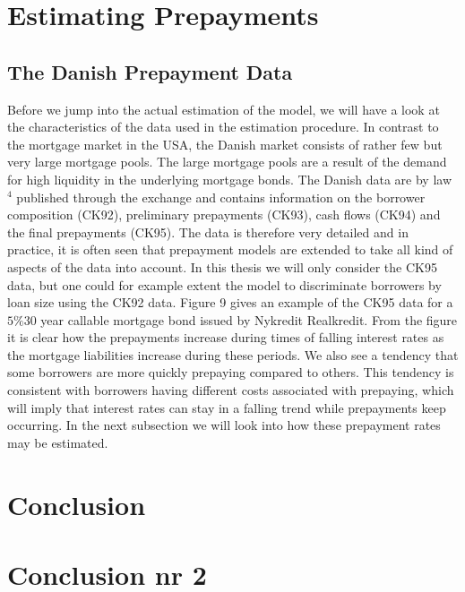 \documentclass[12pt,twoside]{reedthesis}
\begin{document}
\hypertarget{estimating-prepayments-1}{%
\chapter{Estimating Prepayments}\label{estimating-prepayments-1}}

\hypertarget{the-danish-prepayment-data}{%
\section{The Danish Prepayment Data}\label{the-danish-prepayment-data}}

Before we jump into the actual estimation of the model, we will have a look at the characteristics of the data used in the estimation procedure. In contrast to the mortgage market in the USA, the Danish market consists of rather few but very large mortgage pools. The large mortgage pools are a result of the demand for high liquidity in the underlying mortgage bonds. The Danish data are by law \(^{4}\) published through the exchange and contains information on the borrower composition (CK92), preliminary prepayments (CK93), cash flows (CK94) and the final prepayments (CK95). The data is therefore very detailed and in practice, it is often seen that prepayment models are extended to take all kind of aspects of the data into account. In this thesis we will only consider the CK95 data, but one could for example extent the model to discriminate borrowers by loan size using the CK92 data. Figure 9 gives an example of the CK95 data for a \(5 \% 30\) year callable mortgage bond issued by Nykredit Realkredit. From the figure it is clear how the prepayments increase during times of falling interest rates as the mortgage liabilities increase during these periods. We also see a tendency that some borrowers are more quickly prepaying compared to others. This tendency is consistent with borrowers having different costs associated with prepaying, which will imply that interest rates can stay in a falling trend while prepayments keep occurring. In the next subsection we will look into how these prepayment rates may be estimated.

\hypertarget{conclusion}{%
\chapter*{Conclusion}\label{conclusion}}

\hypertarget{conclusion-nr-2}{%
\chapter*{Conclusion nr 2}\label{conclusion-nr-2}}
\end{document}
